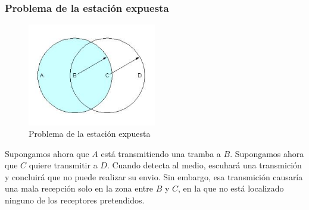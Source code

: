 \subsubsection{Problema de la estación expuesta}
\begin{figure}[H]
	\centering
	\includegraphics[width=0.5\textwidth
]{images/estacion-descubierta.jpg}
	\caption[Problema de la estación expuesta]{Problema de la estación expuesta}
	\label{fig:estacion-expuesta}
\end{figure}

Supongamos ahora que \(A\) está transmitiendo una tramba a \(B\). Supongamos ahora que \(C\) quiere transmitir a \(D\). Cuando detecta al medio, escuhará una transmición y concluirá que no puede realizar su envio. Sin embargo, esa transmición causaría una mala recepción solo en la zona entre \(B\) y \(C\), en la que no está localizado ninguno de los receptores pretendidos.
